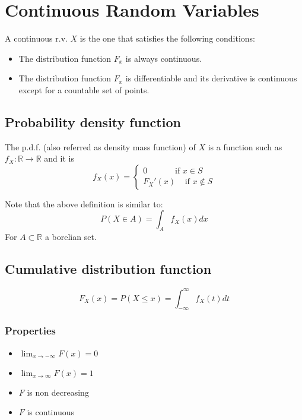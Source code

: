 \section{Continuous Random Variables}
A continuous r.v. $X$ is the one that satisfies the following conditions:
\begin{itemize}
    \item The distribution function $F_x$ is always continuous.
    \item The distribution function $F_x$ is differentiable and its derivative
    is continuous except for a countable set of points.
\end{itemize}

\subsection{Probability density function}
The p.d.f. (also referred as density mass function) of $X$ is a function such as
$f_X:\mathbb{R}\rightarrow\mathbb{R}$ and it is 
\[ 
f_X(x)=\begin{cases}
    0\;\;\;\;\;\;\;\;\;\;\;\; \text{if }x\in S\\
    F_X'(x)\;\;\;\; \text{if }x\notin S
\end{cases}    
\]

\begin{tcolorbox}
    Note that the above definition is similar to:
    \[ P(X\in A) = \int_A f_X(x)dx \]
    For $A\subset\mathbb{R}$ a borelian set.
\end{tcolorbox}


\subsection{Cumulative distribution function}
\[ F_X(x) = P(X\leq x) = \int_{-\infty}^\infty f_X(t)dt \]

\subsubsection{Properties}
\begin{itemize}
    \item $\lim_{x\rightarrow-\infty}F(x)=0$
    \item $\lim_{x\rightarrow\infty}F(x)=1$
    \item $F$ is non decreasing
    \item $F$ is continuous
\end{itemize}

